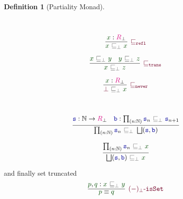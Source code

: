 \documentclass[twoside,11pt,openright]{report}
\theoremstyle{plain} %
\theoremstyle{definition}
\newtheorem{defn}[thm]{Definition}%
\theoremstyle{remark}
\newcommand*{\term}[1]{\textcolor{green!30!black}{#1}} %
\newcommand*{\type}[1]{\textcolor{magenta!90!black}{#1}}
\newcommand*{\relation}[1]{\textcolor{gray!75!black}{\ensuremath{\mathtt{#1}}}}
\newcommand*{\function}[1]{\textcolor{blue!60!black}{\ensuremath{\mathtt{#1}}}}
\newcommand*{\constructor}[1]{\textcolor{purple!60!black}{\ensuremath{\mathtt{#1}}}}
\begin{document}
\begin{defn}[Partiality Monad]
\begin{center}
\begin{minipage}{0.45\linewidth}
    \end{minipage}
  \end{center}
  \strut\\[-15mm]
  \begin{center}
    \begin{minipage}{0.25\linewidth}
      \begin{equation}
        \vcenter{\infer[\constructor{\sqsubseteq_{refl}}]{\term{x}~\relation{\sqsubseteq_{\bot}}~\term{x}}{\term{x} : \type{R}_\bot}}
      \end{equation}
    \end{minipage}
    \hfill
    \begin{minipage}{0.35\linewidth}
      \begin{equation}
        \vcenter{\infer[\constructor{\sqsubseteq_{trans}}]{\term{x}~\relation{\sqsubseteq_{\bot}}~\term{z}}{\term{x}~\relation{\sqsubseteq_{\bot}}~\term{y} & \term{y}~\relation{\sqsubseteq_{\bot}}~\term{z}}}
      \end{equation}
    \end{minipage}
    \hfill
    \begin{minipage}{0.25\linewidth}
      \begin{equation}
        \vcenter{\infer[\constructor{\sqsubseteq_{never}}]{\constructor{\bot}~\relation{\sqsubseteq_{\bot}}~\term{x}}{\term{x} : \type{R}_\bot}}
      \end{equation}
    \end{minipage}
  \end{center}
  \strut\\[-15mm]
  \begin{center}
    \hfill
    \begin{minipage}{0.50\linewidth}
      \begin{equation}
        \vcenter{\infer{\prod_{(n : \mathbb{N})} \function{s}_n~\relation{\sqsubseteq_{\bot}}~\bigsqcup(\function{s},\function{b})}{\function{s} : \mathbb{N} \rightarrow \type{R}_\bot & \function{b} : \prod_{(n : \mathbb{N})} \function{s}_n~\relation{\sqsubseteq_{\bot}}~\function{s}_{n+1} }}
      \end{equation}
    \end{minipage}
    \hfill
    \begin{minipage}{0.3\linewidth}
      \begin{equation}
        \vcenter{\infer{\bigsqcup(\function{s},\function{b})~\relation{\sqsubseteq_{\bot}}~\term{x}}{\prod_{(n:\mathbb{N})} \function{s}_n~\relation{\sqsubseteq_{\bot}}~\term{x}}}
      \end{equation}
    \end{minipage}
  \end{center}
  and finally set truncated
  \begin{equation}
    \vcenter{\infer[\constructor{(-)_\bot\text{-}isSet}]{\term{p} \equiv \term{q}}{\term{p} , \term{q} : \term{x}~\relation{\sqsubseteq_{\bot}}~\term{y}}}
  \end{equation}
\end{defn}
\end{document}
